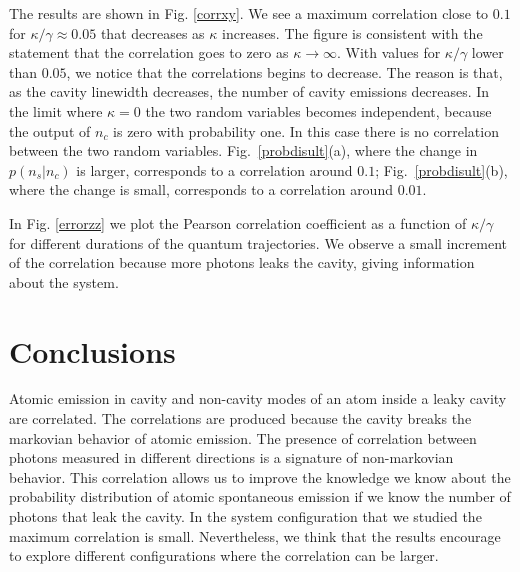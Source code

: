 \documentclass[%
 reprint,
 amsmath,amssymb,
 aps, 
]{revtex4-1}
\begin{document}

The results are shown in Fig. \ref{corrxy}. We see a maximum
correlation close to $0.1$ for $\kappa/\gamma\approx 0.05$ that
decreases as $\kappa$ increases. The figure is consistent with the
statement that the correlation goes to zero as
$\kappa\rightarrow\infty$. With values for $\kappa/\gamma$ lower than
$0.05$, we notice that the correlations begins to decrease. The reason
is that, as the cavity linewidth decreases, the number of cavity
emissions decreases. In the limit where $\kappa=0$ the two random
variables becomes independent, because the output of $n_c$ is zero
with probability one. In this case there is no correlation between the
two random variables. Fig.~\ref{probdisult}(a), where the change in
$p(n_s|n_c)$ is larger, corresponds to a correlation around $0.1$;
Fig.~\ref{probdisult}(b), where the change is small, corresponds to a
correlation around $0.01$.


In Fig. \ref{errorzz} we plot the Pearson correlation coefficient as a
function of $\kappa/\gamma$ for different durations of the quantum
trajectories. We observe a small increment of the correlation
because more photons leaks the cavity, giving information about the
system.


\section{Conclusions}\label{sc:conclusions}
Atomic emission in cavity and non-cavity modes of an atom inside a
leaky cavity are correlated. The correlations are produced because the
cavity breaks the markovian behavior of atomic emission. The presence
of correlation between photons measured in different directions is a
signature of non-markovian behavior. This correlation allows us to
improve the knowledge we know about the probability distribution of
atomic spontaneous emission if we know the number of photons that leak
the cavity. In the system configuration that we studied the maximum
correlation is small. Nevertheless, we think that the results
encourage to explore different configurations where the correlation
can be larger.
\end{document}
